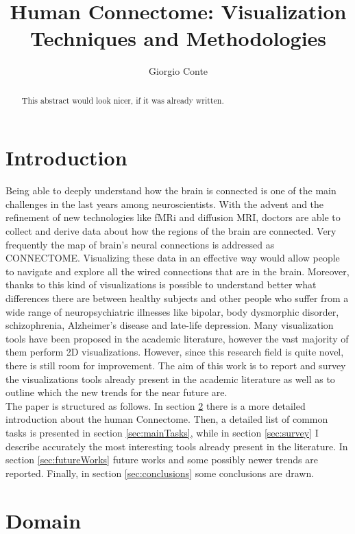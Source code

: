 \documentclass{article}
\title{Human Connectome: Visualization Techniques and Methodologies}
\author{Giorgio Conte}
\affil{Creative Coding Research Group\\ Department of Computer Science\\University of Illinois at Chicago}
\begin{document}
\maketitle
\begin{abstract}
This abstract would look nicer, if it was already written.
\end{abstract}

\begin{multicols}{2}
\raggedcolumns

\section{Introduction}
\label{sec:introduction}

Being able to deeply understand how the brain is connected is one of the main challenges in the last years among neuroscientists. With the advent and the refinement of new technologies like fMRi and diffusion MRI, doctors are able to collect and derive data about how the regions of the brain are connected. Very frequently the map of brain's neural connections is addressed as CONNECTOME.
Visualizing these data in an effective way would allow people to navigate and explore all the wired connections that are in the brain. Moreover, thanks to this kind of visualizations is possible to understand better what differences there are between healthy subjects and other people who suffer from a wide range of neuropsychiatric illnesses like bipolar, body dysmorphic disorder, schizophrenia, Alzheimer's disease and late-life depression. 
Many visualization tools have been proposed in the academic literature, however the vast majority of them perform 2D visualizations. However, since this research field is quite novel, there is still room for improvement.
The aim of this work is to report and survey the visualizations tools already present in the academic literature as well as to outline which the new trends for the near future are.\\
The paper is structured as follows. In section \ref{sec:domain} there is a more detailed introduction about the human Connectome. Then, a detailed list of common tasks is presented in section \ref{sec:mainTasks}, while in section \ref{sec:survey} I describe accurately the most interesting tools already present in the literature. In section \ref{sec:futureWorks} future works and some possibly newer trends are reported. Finally, in section \ref{sec:conclusions} some conclusions are drawn.
\section{Domain}
\label{sec:domain}


\end{multicols}
\end{document}
